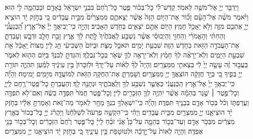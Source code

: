 {\begin{footnotesize}	
וַיְדַבֵּ֥ר יְיָ֖ אֶל־מֹשֶׁ֥ה לֵּאמֹֽר׃ קַדֶּשׁ־לִ֨י כׇל־בְּכ֜וֹר פֶּ֤טֶר כׇּל־רֶ֙חֶם֙ בִּבְנֵ֣י יִשְׂרָאֵ֔ל בָּאָדָ֖ם וּבַבְּהֵמָ֑ה לִ֖י הֽוּא׃ וַיֹּ֨אמֶר מֹשֶׁ֜ה אֶל־הָעָ֗ם זָכ֞וֹר אֶת־הַיּ֤וֹם הַזֶּה֙ אֲשֶׁ֨ר יְצָאתֶ֤ם מִמִּצְרַ֙יִם֙ מִבֵּ֣ית עֲבָדִ֔ים כִּ֚י בְּחֹ֣זֶק יָ֔ד הוֹצִ֧יא יְיָ֛ אֶתְכֶ֖ם מִזֶּ֑ה וְלֹ֥א יֵאָכֵ֖ל חָמֵֽץ׃ הַיּ֖וֹם אַתֶּ֣ם יֹצְאִ֑ים בְּחֹ֖דֶשׁ הָאָבִֽיב׃ וְהָיָ֣ה כִֽי־יְבִיאֲךָ֣ יְיָ֡ אֶל־אֶ֣רֶץ הַֽ֠כְּנַעֲנִ֠י וְהַחִתִּ֨י וְהָאֱמֹרִ֜י וְהַחִוִּ֣י וְהַיְבוּסִ֗י אֲשֶׁ֨ר נִשְׁבַּ֤ע לַאֲבֹתֶ֙יךָ֙ לָ֣תֶת לָ֔ךְ אֶ֛רֶץ זָבַ֥ת חָלָ֖ב וּדְבָ֑שׁ וְעָבַדְתָּ֛ אֶת־הָעֲבֹדָ֥ה הַזֹּ֖את בַּחֹ֥דֶשׁ הַזֶּֽה׃ שִׁבְעַ֥ת יָמִ֖ים תֹּאכַ֣ל מַצֹּ֑ת וּבַיּוֹם֙ הַשְּׁבִיעִ֔י חַ֖ג לַייָ׃ מַצּוֹת֙ יֵֽאָכֵ֔ל אֵ֖ת שִׁבְעַ֣ת הַיָּמִ֑ים וְלֹֽא־יֵרָאֶ֨ה לְךָ֜ חָמֵ֗ץ וְלֹֽא־יֵרָאֶ֥ה לְךָ֛ שְׂאֹ֖ר בְּכׇל־גְּבֻלֶֽךָ׃ וְהִגַּדְתָּ֣ לְבִנְךָ֔ בַּיּ֥וֹם הַה֖וּא לֵאמֹ֑ר בַּעֲב֣וּר זֶ֗ה עָשָׂ֤ה יְיָ֙ לִ֔י בְּצֵאתִ֖י מִמִּצְרָֽיִם׃ וְהָיָה֩ לְךָ֨ לְא֜וֹת עַל־יָדְךָ֗ וּלְזִכָּרוֹן֙ בֵּ֣ין עֵינֶ֔יךָ לְמַ֗עַן תִּהְיֶ֛ה תּוֹרַ֥ת יְיָ֖ בְּפִ֑יךָ כִּ֚י בְּיָ֣ד חֲזָקָ֔ה הוֹצִֽאֲךָ֥ יְיָ֖ מִמִּצְרָֽיִם׃ וְשָׁמַרְתָּ֛ אֶת־הַחֻקָּ֥ה הַזֹּ֖את לְמוֹעֲדָ֑הּ מִיָּמִ֖ים יָמִֽימָה׃\hfill\break
וְהָיָ֞ה כִּֽי־יְבִאֲךָ֤ יְיָ֙ אֶל־אֶ֣רֶץ הַֽכְּנַעֲנִ֔י כַּאֲשֶׁ֛ר נִשְׁבַּ֥ע לְךָ֖ וְלַֽאֲבֹתֶ֑יךָ וּנְתָנָ֖הּ לָֽךְ׃ וְהַעֲבַרְתָּ֥ כׇל־פֶּֽטֶר־רֶ֖חֶם לַֽייָ֑ וְכׇל־פֶּ֣טֶר ׀ שֶׁ֣גֶר בְּהֵמָ֗ה אֲשֶׁ֨ר יִהְיֶ֥ה לְךָ֛ הַזְּכָרִ֖ים לַייָ׃ וְכׇל־פֶּ֤טֶר חֲמֹר֙ תִּפְדֶּ֣ה בְשֶׂ֔ה וְאִם־לֹ֥א תִפְדֶּ֖ה וַעֲרַפְתּ֑וֹ וְכֹ֨ל בְּכ֥וֹר אָדָ֛ם בְּבָנֶ֖יךָ תִּפְדֶּֽה׃ וְהָיָ֞ה כִּֽי־יִשְׁאָלְךָ֥ בִנְךָ֛ מָחָ֖ר לֵאמֹ֣ר מַה־זֹּ֑את וְאָמַרְתָּ֣ אֵלָ֔יו בְּחֹ֣זֶק יָ֗ד הוֹצִיאָ֧נוּ יְיָ֛ מִמִּצְרַ֖יִם מִבֵּ֥ית עֲבָדִֽים׃ וַיְהִ֗י כִּֽי־הִקְשָׁ֣ה פַרְעֹה֮ לְשַׁלְּחֵ֒נוּ֒ וַיַּהֲרֹ֨ג יְיָ֤ כׇּל־בְּכוֹר֙ בְּאֶ֣רֶץ מִצְרַ֔יִם מִבְּכֹ֥ר אָדָ֖ם וְעַד־בְּכ֣וֹר בְּהֵמָ֑ה עַל־כֵּן֩ אֲנִ֨י זֹבֵ֜חַ לַֽייָ֗ כׇּל־פֶּ֤טֶר רֶ֙חֶם֙ הַזְּכָרִ֔ים וְכׇל־בְּכ֥וֹר בָּנַ֖י אֶפְדֶּֽה׃ וְהָיָ֤ה לְאוֹת֙ עַל־יָ֣דְכָ֔ה וּלְטוֹטָפֹ֖ת בֵּ֣ין עֵינֶ֑יךָ כִּ֚י בְּחֹ֣זֶק יָ֔ד הוֹצִיאָ֥נוּ יְיָ֖ מִמִּצְרָֽיִם׃
\end{footnotesize}

}{}